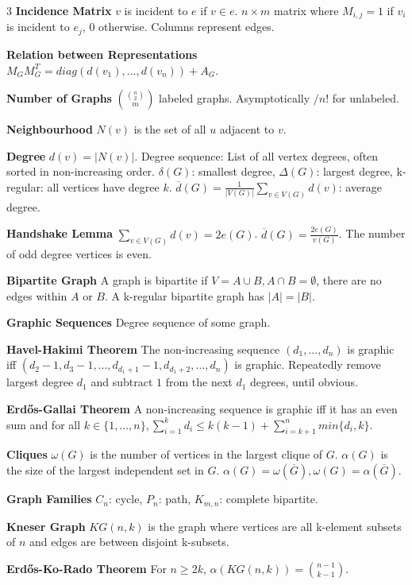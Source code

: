 \documentclass[10pt, landscape]{article}
\begin{document}
\begin{multicols*}{3}
\textbf{Incidence Matrix} $v$ is incident to $e$ if $v \in e$. $n \times m$ matrix where $M_{i,j}=1$ if $v_i$ is incident to $e_j$, $0$ otherwise. Columns represent edges.

\textbf{Relation between Representations} $M_GM_G^T=diag(d(v_1),...,d(v_n))+A_G$.

\textbf{Number of Graphs} ${{n \choose 2} \choose m}$ labeled graphs. Asymptotically $/n!$ for unlabeled.

\textbf{Neighbourhood} $N(v)$ is the set of all $u$ adjacent to $v$.

\textbf{Degree} $d(v)=|N(v)|$. Degree sequence: List of all vertex degrees, often sorted in non-increasing order. $\delta(G)$: smallest degree, $\Delta(G)$: largest degree, k-regular: all vertices have degree $k$. $\overline{d}(G)=\frac{1}{|V(G)|}\sum_{v \in V(G)}d(v)$: average degree.

\textbf{Handshake Lemma} $\sum_{v \in V(G)}d(v)=2e(G)$. $\overline{d}(G)=\frac{2e(G)}{v(G)}$. The number of odd degree vertices is even.

\textbf{Bipartite Graph} A graph is bipartite if $V=A \cup B, A \cap B = \emptyset$, there are no edges within $A$ or $B$. A k-regular bipartite graph has $|A|=|B|$.

\textbf{Graphic Sequences} Degree sequence of some graph.

\textbf{Havel-Hakimi Theorem} The non-increasing sequence $(d_1,...,d_n)$ is graphic iff $(d_2-1, d_3-1,...,d_{d_1+1}-1,d_{d_1+2},...,d_n)$ is graphic. Repeatedly remove largest degree $d_1$ and subtract $1$ from the next $d_1$ degrees, until obvious.

\textbf{Erdős-Gallai Theorem} A non-increasing sequence is graphic iff it has an even sum and for all $k \in \{1,...,n\}, \sum_{i=1}^k d_i \leq k(k-1)+\sum_{i=k+1}^n min\{d_i,k\}$.

\textbf{Cliques} $\omega(G)$ is the number of vertices in the largest clique of $G$. $\alpha(G)$ is the size of the largest independent set in $G$. $\alpha(G)=\omega(\overline{G}), \omega(G)=\alpha(\overline{G})$.

\textbf{Graph Families} $C_n$: cycle, $P_n$: path, $K_{m,n}$: complete bipartite.

\textbf{Kneser Graph} $KG(n,k)$ is the graph where vertices are all k-element subsets of $n$ and edges are between disjoint k-subsets. 

\textbf{Erdős-Ko-Rado Theorem} For $n \geq 2k$, $\alpha(KG(n,k))={n-1 \choose k-1}$.


\end{multicols*}
\end{document}
